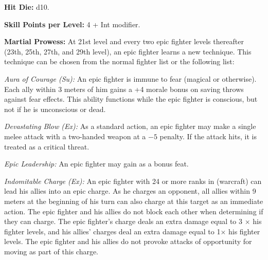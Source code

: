 

\textbf{Hit Die:} d10.

\textbf{Skill Points per Level:} 4 + Int modifier.

\textbf{Martial Prowess:} At 21st level and every two epic fighter levels thereafter (23th, 25th, 27th, and 29th level), an epic fighter learns a new technique. This technique can be chosen from the normal fighter list or the following list:

\textit{Aura of Courage (Su):} An epic fighter is immune to fear (magical or otherwise). Each ally within 3 meters of him gains a +4 morale bonus on saving throws against fear effects. This ability functions while the epic fighter is conscious, but not if he is unconscious or dead.

\textit{Devastating Blow (Ex):} As a standard action, an epic fighter may make a single melee attack with a two-handed weapon at a $-5$ penalty. If the attack hits, it is treated as a critical threat.

\textit{Epic Leadership:} An epic fighter may gain  as a bonus feat.

\textit{Indomitable Charge (Ex):} An epic fighter with 24 or more ranks in  (warcraft) can lead his allies into an epic charge. As he charges an opponent, all allies within 9 meters at the beginning of his turn can also charge at this target as an immediate action. The epic fighter and his allies do not block each other when determining if they can charge. The epic fighter's charge deals an extra damage equal to 3 $\times$ his fighter levels, and his allies' charges deal an extra damage equal to 1\onehalf $\times$ his fighter levels. The epic fighter and his allies do not provoke attacks of opportunity for moving as part of this charge.

